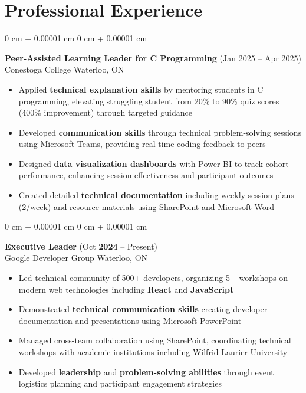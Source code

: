 \documentclass[10pt, letterpaper]{article}
\newenvironment{highlights}{
    \begin{itemize}[
        topsep=0.10 cm,
        parsep=0.10 cm,
        partopsep=0pt,
        itemsep=0pt,
        leftmargin=0 cm + 10pt
    ]
}{
    \end{itemize}
} %
\newenvironment{onecolentry}{
    \begin{adjustwidth}{
        0 cm + 0.00001 cm
    }{
        0 cm + 0.00001 cm
    }
}{
    \end{adjustwidth}
} %
\begin{document}
\section{Professional Experience}
\vspace{-12pt}
\hrulefill
\begin{onecolentry}
    {\normalsize \textbf{Peer-Assisted Learning Leader for C Programming}} \hfill {(Jan 2025 – Apr 2025)}\\
    {Conestoga College} \hfill {Waterloo, ON}\\
    \begin{highlights}
        \item Applied \textbf{technical explanation skills} by mentoring students in C programming, elevating struggling student from 20\% to 90\% quiz scores (400\% improvement) through targeted guidance
        \item Developed \textbf{communication skills} through technical problem-solving sessions using Microsoft Teams, providing real-time coding feedback to peers
        \item Designed \textbf{data visualization dashboards} with Power BI to track cohort performance, enhancing session effectiveness and participant outcomes
        \item Created detailed \textbf{technical documentation} including weekly session plans (2/week) and resource materials using SharePoint and Microsoft Word
    \end{highlights}
\end{onecolentry}
\begin{onecolentry}
    {\normalsize \textbf{Executive Leader}} \hfill {(Oct \textbf{2024} – Present)}\\
    {Google Developer Group} \hfill {Waterloo, ON}\\
    \begin{highlights}
        \item Led technical community of 500+ developers, organizing 5+ workshops on modern web technologies including \textbf{React} and \textbf{JavaScript}
        \item Demonstrated \textbf{technical communication skills} creating developer documentation and presentations using Microsoft PowerPoint
        \item Managed cross-team collaboration using SharePoint, coordinating technical workshops with academic institutions including Wilfrid Laurier University
        \item Developed \textbf{leadership} and \textbf{problem-solving abilities} through event logistics planning and participant engagement strategies
    \end{highlights}
\end{onecolentry}
\end{document}
